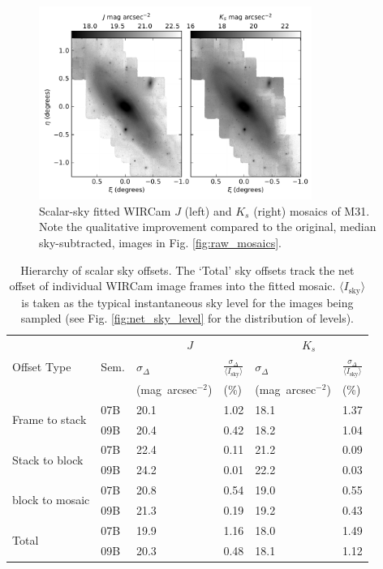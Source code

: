 \documentclass[iop]{emulateapj}
\begin{document}
\begin{figure}[t]
	\centering
		\includegraphics[width=3.5in]{figs/scalar_mosaics}
	\caption{Scalar-sky fitted WIRCam $J$ (left) and $K_s$ (right) mosaics of M31. Note the qualitative improvement compared to the original, median sky-subtracted, images in Fig. \ref{fig:raw_mosaics}.}
	\label{fig:scalar_mosaics}
\end{figure}

\begin{table}[t]
    \centering
    \caption[Hierarchy of scalar sky offsets]{Hierarchy of scalar sky offsets. The `Total' sky offsets track the net offset of individual WIRCam image frames into the fitted mosaic. $\langle I_\mathrm{sky}\rangle$ is taken as the typical instantaneous sky level for the images being sampled (see Fig. \ref{fig:net_sky_level} for the distribution of levels).}
    \label{tab:offset_hierarchy}
\begin{tabular}{ll|ll|ll}
 &  & \multicolumn{2}{c|}{$J$} & \multicolumn{2}{c}{$K_s$} \\ %
Offset Type & Sem. & $\sigma_\Delta$ & $\frac{\sigma_\Delta}{\langle I_\mathrm{sky}\rangle }$ & $\sigma_\Delta$ & $\frac{\sigma_\Delta}{\langle I_\mathrm{sky}\rangle }$ \\
 & & \tiny{(mag~arcsec$^{-2}$)} &  \tiny{(\%)} & \tiny{(mag~arcsec$^{-2}$)} &  \tiny{(\%)} \\
\hline
\multirow{2}{*}{Frame to stack} & 07B & 20.1 & 1.02 & 18.1 & 1.37 \\
 & 09B  & 20.4 & 0.42 & 18.2 & 1.04 \\
\hline
\multirow{2}{*}{Stack to block} & 07B & 22.4 & 0.11 & 21.2 & 0.09 \\
  & 09B & 24.2 & 0.01 & 22.2 & 0.03\\
\hline
\multirow{2}{*}{block to mosaic} & 07B & 20.8 & 0.54 & 19.0 & 0.55 \\
  & 09B & 21.3 & 0.19 & 19.2 & 0.43 \\
\hline
\multirow{2}{*}{Total} & 07B & 19.9 & 1.16 & 18.0 & 1.49 \\
  & 09B & 20.3 & 0.48 & 18.1 & 1.12 \\
\end{tabular}
\end{table}
\end{document}
